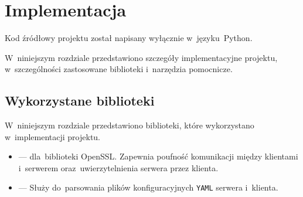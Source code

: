 \documentclass[thesis]{subfiles}
\begin{document}
\chapter{Implementacja}
\label{chapter:implementacja}

Kod źródłowy projektu został napisany wyłącznie w~języku~Python.

W~niniejszym rozdziale przedstawiono szczegóły implementacyjne projektu, w~szczególności zastosowane biblioteki i~narzędzia pomocnicze.


\section{Wykorzystane biblioteki}

W~niniejszym rozdziale przedstawiono biblioteki, które wykorzystano w~implementacji projektu.

\begin{itemize}
	\item {} ---  dla~biblioteki OpenSSL. Zapewnia poufność komunikacji między klientami i~serwerem oraz~uwierzytelnienia serwera przez klienta.
	\item {} --- Służy do~parsowania plików konfiguracyjnych \texttt{YAML} serwera i~klienta.
\end{itemize}
\end{document}
